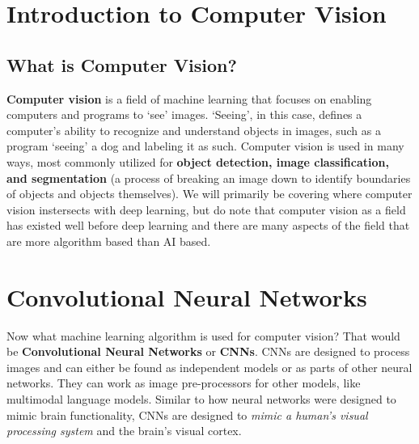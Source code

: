 \section{Introduction to Computer Vision}
\subsection{What is Computer Vision?}
    \large \textbf{Computer vision} is a field of machine learning that focuses on enabling computers and programs to \lq see' images. \lq Seeing', in this case, defines a computer's ability to recognize and understand objects in images, such as a program \lq seeing' a dog and labeling it as such. Computer vision is used in many ways, most commonly utilized for \textbf{object detection, image classification, and segmentation} (a process of breaking an image down to identify boundaries of objects and objects themselves).  We will primarily be covering where computer vision instersects with deep learning, but do note that computer vision as a field has existed well before deep learning and there are many aspects of the field that are more algorithm based than AI based.

\section{Convolutional Neural Networks}
    \large Now what machine learning algorithm is used for computer vision? That would be \textbf{Convolutional Neural Networks} or \textbf{CNNs}. CNNs are designed to process images and can either be found as independent models or as parts of other neural networks. They can work as image pre-processors for other models, like multimodal language models. Similar to how neural networks were designed to mimic brain functionality, CNNs are designed to \textit{mimic a human's visual processing system} and the brain's visual cortex. 

